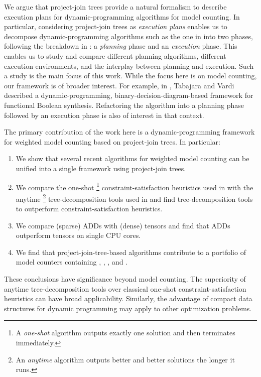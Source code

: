 We argue that project-join trees provide a natural formalism to describe execution plans for dynamic-programming algorithms for model counting.
In particular, considering project-join trees as \emph{execution plans} enables us to decompose dynamic-programming algorithms such as the one in \cite{DPV20} into two phases, following the breakdown in \cite{dudek2020parallel}: a \emph{planning} phase and an \emph{execution} phase.
This enables us to study and compare different planning algorithms, different execution environments, and the interplay between planning and execution.
Such a study is the main focus of this work.
While the focus here is on model counting, our framework is of broader interest.
For example, in \cite{tabajara2017factored}, Tabajara and Vardi described a dynamic-programming, binary-decision-diagram-based framework for functional Boolean synthesis.
Refactoring the algorithm into a planning phase followed by an execution phase is also of interest in that context.

The primary contribution of the work here is a dynamic-programming framework for weighted model counting based on project-join trees.
In particular:
\begin{enumerate}
    \item We show that several recent algorithms for weighted model counting \cite{DPV20,DDV19,fichte2020exploiting} can be unified into a single framework using project-join trees.
    \item We compare the one-shot%
    \footnote{A \emph{one-shot} algorithm outputs exactly one solution and then terminates immediately.}
    constraint-satisfaction heuristics used in \cite{DPV20} with the anytime%
    \footnote{An \emph{anytime} algorithm outputs better and better solutions the longer it runs.} tree-decomposition tools used in \cite{DDV19} and find     tree-decomposition tools to outperform
    constraint-satisfaction heuristics.
    \item We compare (sparse) ADDs \cite{bahar1997algebraic} with (dense) tensors \cite{KKCLA17} and find that ADDs outperform tensors on single CPU cores.
    \item We find that project-join-tree-based algorithms contribute to a portfolio of model counters containing \cachet{} \cite{sang2004combining}, \ctd{} \cite{darwiche2004new}, \df{} \cite{LM17}, and \minictd{} \cite{OD15}.
\end{enumerate}
These conclusions have significance beyond model counting.
The superiority of anytime tree-decomposition tools over classical one-shot constraint-satisfaction heuristics can have broad applicability.
Similarly, the advantage of compact data structures for dynamic programming may apply to other optimization problems.

